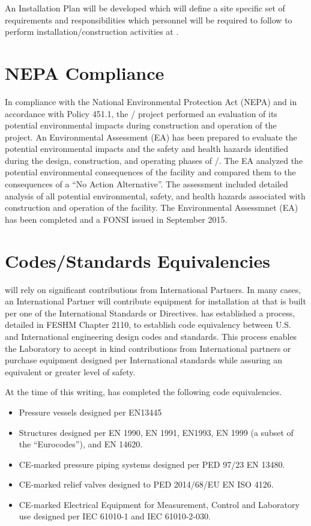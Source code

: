 An Installation  Plan will be developed
which will define a site specific set of  requirements and
responsibilities which personnel will be required to follow to perform
installation/construction activities at \surf.

\section{NEPA Compliance}

In compliance with the National Environmental Protection Act (NEPA)
and in accordance with  Policy 451.1, the / project
performed an evaluation of its potential environmental impacts during
construction and operation of the project.  An Environmental
Assessment (EA) has been prepared to evaluate the potential
environmental impacts and the safety and health hazards identified
during the design, construction, and operating phases of /.
The EA analyzed the potential environmental consequences of the
facility and compared them to the consequences of a ``No Action
Alternative''. The assessment included detailed analysis of all
potential environmental, safety, and health hazards associated with
construction and operation of the facility.  The Environmental
Assessmnet (EA) has been completed and a FONSI issued in September
2015.

\section{Codes/Standards Equivalencies}

 will rely on significant contributions from International
Partners. In many cases, an International Partner will contribute
equipment for installation at \fnal that is built per one of the
International Standards or Directives. \fnal has established a
process, detailed in FESHM Chapter 2110, to establish code equivalency
between U.S. and International engineering design codes and
standards. This process enables the Laboratory to accept in kind
contributions from International partners or purchase equipment
designed per International standards while assuring an equivalent or
greater level of safety.

At the time of this writing, \fnal has completed the following code
equivalencies.
\begin{itemize}
 \item Pressure vessels designed per EN13445
 \item Structures designed per EN 1990, EN 1991, EN1993, EN 1999 (a
   subset of the “Eurocodes”), and EN 14620.
 \item CE-marked pressure piping systems designed per PED 97/23 EN 13480.
 \item CE-marked relief valves designed to PED 2014/68/EU EN ISO 4126.
 \item CE-marked Electrical Equipment for Measurement, Control and
   Laboratory use designed per IEC 61010-1 and IEC 61010-2-030.
\end{itemize}

